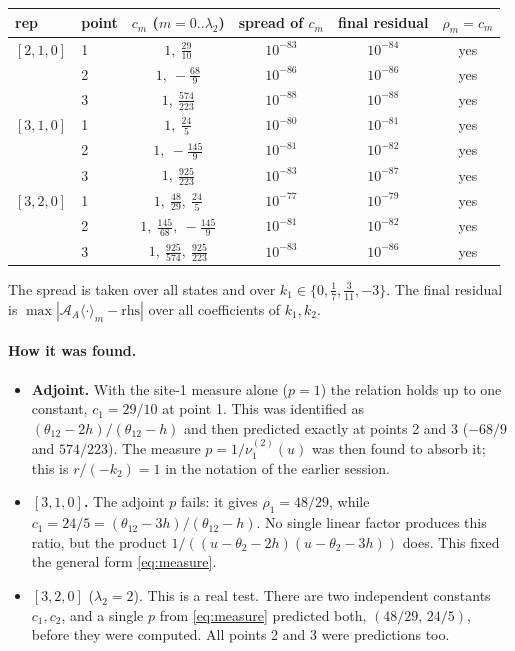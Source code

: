 \documentclass[11pt]{article}
\theoremstyle{definition}
\theoremstyle{remark}
\begin{document}
\begin{center}
\begin{tabular}{llcccc}\toprule
rep & point & $c_m$ ($m=0..\lambda_2$) & spread of $c_m$ & final residual & $\rho_m=c_m$\\\midrule
$[2,1,0]$ & 1 & $1,\ \tfrac{29}{10}$ & $10^{-83}$ & $10^{-84}$ & yes\\
 & 2 & $1,\ -\tfrac{68}{9}$ & $10^{-86}$ & $10^{-86}$ & yes\\
 & 3 & $1,\ \tfrac{574}{223}$ & $10^{-88}$ & $10^{-88}$ & yes\\
$[3,1,0]$ & 1 & $1,\ \tfrac{24}{5}$ & $10^{-80}$ & $10^{-81}$ & yes\\
 & 2 & $1,\ -\tfrac{145}{9}$ & $10^{-81}$ & $10^{-82}$ & yes\\
 & 3 & $1,\ \tfrac{925}{223}$ & $10^{-83}$ & $10^{-87}$ & yes\\
$[3,2,0]$ & 1 & $1,\ \tfrac{48}{29},\ \tfrac{24}{5}$ & $10^{-77}$ & $10^{-79}$ & yes\\
 & 2 & $1,\ \tfrac{145}{68},\ -\tfrac{145}{9}$ & $10^{-81}$ & $10^{-82}$ & yes\\
 & 3 & $1,\ \tfrac{925}{574},\ \tfrac{925}{223}$ & $10^{-83}$ & $10^{-86}$ & yes\\\bottomrule
\end{tabular}
\end{center}
The spread is taken over all states and over $k_1\in\{0,\tfrac17,\tfrac3{11},-3\}$. The final residual is $\max|\mathcal A_A\langle\cdot\rangle_m-\text{rhs}|$ over all coefficients of $k_1,k_2$.

\paragraph{How it was found.}
\begin{itemize}
\item \textbf{Adjoint.} With the site-1 measure alone ($p=1$) the relation holds up to one constant, $c_1=29/10$ at point 1. This was identified as $(\theta_{12}-2h)/(\theta_{12}-h)$ and then predicted exactly at points 2 and 3 ($-68/9$ and $574/223$). The measure $p=1/\nu^{(2)}_1(u)$ was then found to absorb it; this is $r/(-k_2)=1$ in the notation of the earlier session.
\item \textbf{$[3,1,0]$.} The adjoint $p$ fails: it gives $\rho_1=48/29$, while $c_1=24/5=(\theta_{12}-3h)/(\theta_{12}-h)$. No single linear factor produces this ratio, but the product $1/((u-\theta_2-2h)(u-\theta_2-3h))$ does. This fixed the general form \eqref{eq:measure}.
\item \textbf{$[3,2,0]$} ($\lambda_2=2$). This is a real test. There are two independent constants $c_1,c_2$, and a single $p$ from \eqref{eq:measure} predicted both, $(48/29,\,24/5)$, before they were computed. All points 2 and 3 were predictions too.
\end{itemize}
\end{document}
